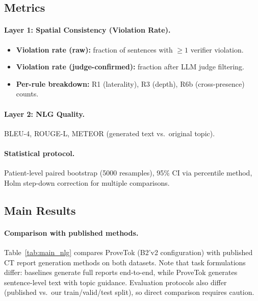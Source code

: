 \documentclass[11pt,a4paper]{article}
\begin{document}
\subsection{Metrics}

\paragraph{Layer 1: Spatial Consistency (Violation Rate).}
\begin{itemize}[nosep]
    \item \textbf{Violation rate (raw):} fraction of sentences with $\ge 1$ verifier violation.
    \item \textbf{Violation rate (judge-confirmed):} fraction after LLM judge filtering.
    \item \textbf{Per-rule breakdown:} R1 (laterality), R3 (depth), R6b (cross-presence) counts.
\end{itemize}

\paragraph{Layer 2: NLG Quality.}
BLEU-4, ROUGE-L, METEOR (generated text vs.\ original topic).

\paragraph{Statistical protocol.}
Patient-level paired bootstrap (5000 resamples), 95\% CI via percentile method, Holm step-down correction for multiple comparisons.

\subsection{Main Results}

\paragraph{Comparison with published methods.}
Table~\ref{tab:main_nlg} compares ProveTok (B2'v2 configuration) with published CT report generation methods on both datasets.
Note that task formulations differ: baselines generate full reports end-to-end, while ProveTok generates sentence-level text with topic guidance.
Evaluation protocols also differ (published vs.\ our train/valid/test split), so direct comparison requires caution.
\end{document}
